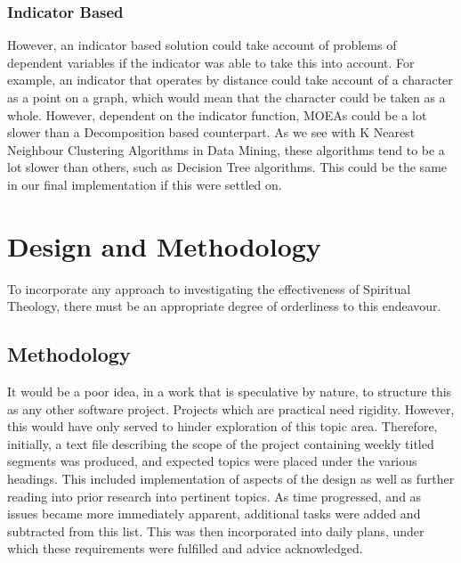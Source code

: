 \documentclass[11pt]{article}
\begin{document}
\subsubsection{Indicator Based} 
However, an indicator based solution could take account of problems of dependent variables if the indicator was able to take this into account. For example, an indicator that operates by distance could take account of a character as a point on a graph, which would mean that the character could be taken as a whole. However, dependent on the indicator function, MOEAs could be a lot slower than a Decomposition based counterpart. As we see with K Nearest Neighbour Clustering Algorithms in Data Mining\cite{CompareML}, these algorithms tend to be a lot slower than others, such as Decision Tree algorithms. This could be the same in our final implementation if this were settled on. \\

\section{Design and Methodology}
To incorporate any approach to investigating the effectiveness of Spiritual Theology, there must be an appropriate degree of orderliness to this endeavour.
\subsection{Methodology}
It would be a poor idea, in a work that is speculative by nature, to structure this as any other software project. Projects which are practical need rigidity. However, this would have only served to hinder exploration of this topic area. Therefore, initially, a text file describing the scope of the project containing weekly titled segments was produced, and expected topics were placed under the various headings. This included implementation of aspects of the design as well as further reading into prior research into pertinent topics. As time progressed, and as issues became more immediately apparent, additional tasks were added and subtracted from this list. This was then incorporated into daily plans, under which these requirements were fulfilled and advice acknowledged. 
\end{document}
